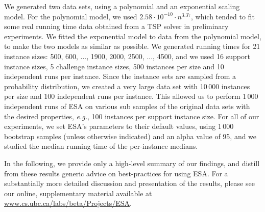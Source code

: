 \documentclass[aic]{iosart2x}
\newcommand{\eg}{\emph{e.g.}}
\begin{document}
We generated two data sets, using a polynomial and an exponential scaling model. For the polynomial model, we used $2.58\cdot 10^{-10} \cdot n^{3.37}$, which tended to fit some real running time data obtained from a TSP solver in preliminary experiments. 
We fitted the exponential model to data from the polynomial model, to make the two models as similar as possible. 
We generated running times for 21 instance sizes: 500, 600, ..., 1900, 2000, 2500, ..., 4500, and we used 16 support instance sizes, 5 challenge instance sizes, 500 instances per size and 10 independent runs per instance. 
Since the instance sets are sampled from a probability distribution, we created a very large data set with 10\,000 instances per size and 100 independent runs per instance. 
This allowed us to perform 1\,000 independent runs of ESA on various sub samples of the original data sets with the desired properties, \eg{}, 100 instances per support instance size.
For all of our experiments, we set ESA's parameters to their default values, using 1\,000 bootstrap samples (unless otherwise indicated) and an alpha value of 95, and we studied the median running time of the per-instance medians. 

In the following, we provide only a high-level summary of our findings, and distill from these results generic advice on best-practices for using ESA. 
For a substantially more detailed discussion and presentation of the results, please see our online, supplementary material available at \url{www.cs.ubc.ca/labs/beta/Projects/ESA}.

\end{document}
